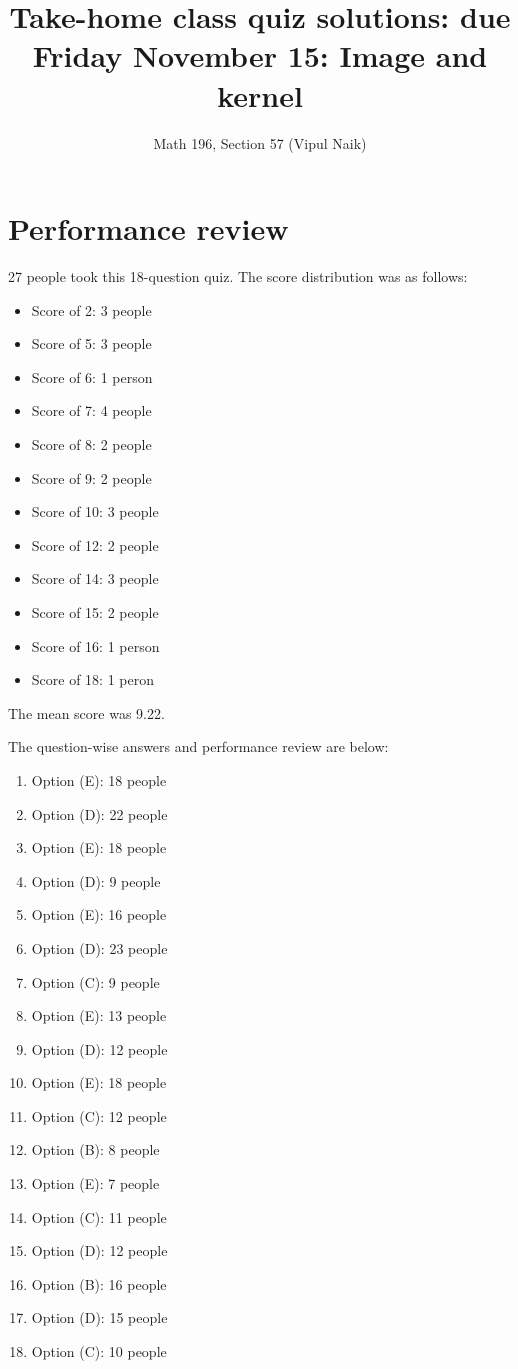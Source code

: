 \documentclass[10pt]{amsart}
\title{Take-home class quiz solutions: due Friday November 15: Image and kernel}
\author{Math 196, Section 57 (Vipul Naik)}
\begin{document}
\maketitle

\section{Performance review}

27 people took this 18-question quiz. The score distribution was as follows:

\begin{itemize}
\item Score of 2: 3 people
\item Score of 5: 3 people
\item Score of 6: 1 person
\item Score of 7: 4 people
\item Score of 8: 2 people
\item Score of 9: 2 people
\item Score of 10: 3 people
\item Score of 12: 2 people
\item Score of 14: 3 people
\item Score of 15: 2 people
\item Score of 16: 1 person
\item Score of 18: 1 peron
\end{itemize}

The mean score was 9.22.

The question-wise answers and performance review are below:

\begin{enumerate}
\item Option (E): 18 people
\item Option (D): 22 people
\item Option (E): 18 people
\item Option (D): 9 people
\item Option (E): 16 people
\item Option (D): 23 people
\item Option (C): 9 people
\item Option (E): 13 people
\item Option (D): 12 people
\item Option (E): 18 people
\item Option (C): 12 people
\item Option (B): 8 people
\item Option (E): 7 people
\item Option (C): 11 people
\item Option (D): 12 people
\item Option (B): 16 people
\item Option (D): 15 people
\item Option (C): 10 people
\end{enumerate}
\end{document}
